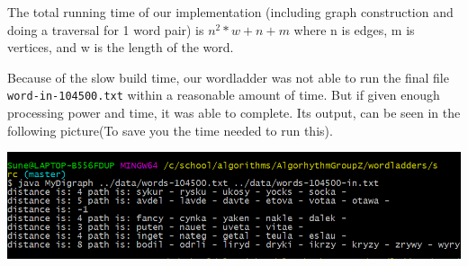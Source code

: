 \documentclass{tufte-handout}
\begin{document}
  The total running time of our implementation (including graph construction and doing a traversal for 1 word pair) is 
$n^2 * w + n + m$  
where n is edges, m is vertices, and w is the length of the word.

Because of the slow build time, our wordladder was not able to run the final file \texttt{word-in-104500.txt} within a reasonable amount of time.
But if given enough processing power and time, it was able to complete. Its output, can be seen in the following picture(To save you the time needed to run this).


\includegraphics{largefile.png}
\end{document}
